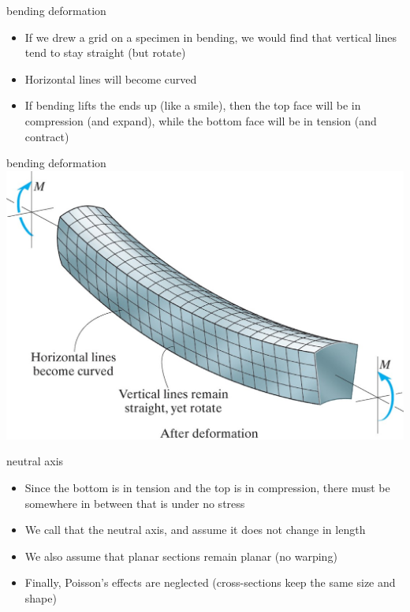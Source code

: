 \begin{frame}{bending deformation}
\protect\hypertarget{bending-deformation}{}
\begin{itemize}
\tightlist
\item
  If we drew a grid on a specimen in bending, we would find that
  vertical lines tend to stay straight (but rotate)
\item
  Horizontal lines will become curved
\item
  If bending lifts the ends up (like a smile), then the top face will be
  in compression (and expand), while the bottom face will be in tension
  (and contract)
\end{itemize}
\end{frame}

\begin{frame}{bending deformation}
\protect\hypertarget{bending-deformation-1}{}
\includegraphics{../images/beam-deformation.jpg}
\end{frame}

\begin{frame}{neutral axis}
\protect\hypertarget{neutral-axis}{}
\begin{itemize}
\tightlist
\item
  Since the bottom is in tension and the top is in compression, there
  must be somewhere in between that is under no stress
\item
  We call that the neutral axis, and assume it does not change in length
\item
  We also assume that planar sections remain planar (no warping)
\item
  Finally, Poisson's effects are neglected (cross-sections keep the same
  size and shape)
\end{itemize}
\end{frame}

